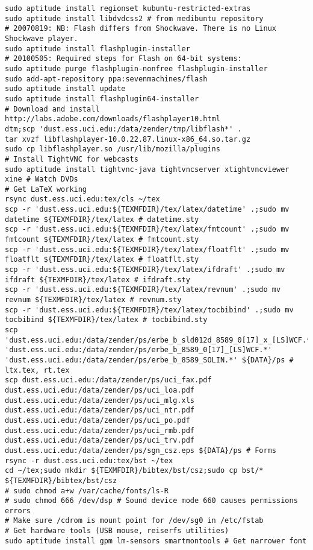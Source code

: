 \documentclass[12pt,twoside]{article}
\begin{document}
\begin{verbatim}
sudo aptitude install regionset kubuntu-restricted-extras
sudo aptitude install libdvdcss2 # from medibuntu repository
# 20070819: NB: Flash differs from Shockwave. There is no Linux Shockwave player.
sudo aptitude install flashplugin-installer
# 20100505: Required steps for Flash on 64-bit systems:
sudo aptitude purge flashplugin-nonfree flashplugin-installer
sudo add-apt-repository ppa:sevenmachines/flash
sudo aptitude install update
sudo aptitude install flashplugin64-installer
# Download and install http://labs.adobe.com/downloads/flashplayer10.html
dtm;scp 'dust.ess.uci.edu:/data/zender/tmp/libflash*' .
tar xvzf libflashplayer-10.0.22.87.linux-x86_64.so.tar.gz
sudo cp libflashplayer.so /usr/lib/mozilla/plugins
# Install TightVNC for webcasts
sudo aptitude install tightvnc-java tightvncserver xtightvncviewer
xine # Watch DVDs
# Get LaTeX working
rsync dust.ess.uci.edu:tex/cls ~/tex
scp -r 'dust.ess.uci.edu:${TEXMFDIR}/tex/latex/datetime' .;sudo mv datetime ${TEXMFDIR}/tex/latex # datetime.sty
scp -r 'dust.ess.uci.edu:${TEXMFDIR}/tex/latex/fmtcount' .;sudo mv fmtcount ${TEXMFDIR}/tex/latex # fmtcount.sty
scp -r 'dust.ess.uci.edu:${TEXMFDIR}/tex/latex/floatflt' .;sudo mv floatflt ${TEXMFDIR}/tex/latex # floatflt.sty
scp -r 'dust.ess.uci.edu:${TEXMFDIR}/tex/latex/ifdraft' .;sudo mv ifdraft ${TEXMFDIR}/tex/latex # ifdraft.sty
scp -r 'dust.ess.uci.edu:${TEXMFDIR}/tex/latex/revnum' .;sudo mv revnum ${TEXMFDIR}/tex/latex # revnum.sty
scp -r 'dust.ess.uci.edu:${TEXMFDIR}/tex/latex/tocbibind' .;sudo mv tocbibind ${TEXMFDIR}/tex/latex # tocbibind.sty
scp 'dust.ess.uci.edu:/data/zender/ps/erbe_b_sld012d_8589_0[17]_x_[LS]WCF.*' 'dust.ess.uci.edu:/data/zender/ps/erbe_b_8589_0[17]_[LS]WCF.*' 'dust.ess.uci.edu:/data/zender/ps/erbe_b_8589_SOLIN.*' ${DATA}/ps # ltx.tex, rt.tex
scp dust.ess.uci.edu:/data/zender/ps/uci_fax.pdf dust.ess.uci.edu:/data/zender/ps/uci_loa.pdf dust.ess.uci.edu:/data/zender/ps/uci_mlg.xls dust.ess.uci.edu:/data/zender/ps/uci_ntr.pdf dust.ess.uci.edu:/data/zender/ps/uci_po.pdf dust.ess.uci.edu:/data/zender/ps/uci_rmb.pdf dust.ess.uci.edu:/data/zender/ps/uci_trv.pdf dust.ess.uci.edu:/data/zender/ps/sgn_csz.eps ${DATA}/ps # Forms
rsync -r dust.ess.uci.edu:tex/bst ~/tex
cd ~/tex;sudo mkdir ${TEXMFDIR}/bibtex/bst/csz;sudo cp bst/* ${TEXMFDIR}/bibtex/bst/csz
# sudo chmod a+w /var/cache/fonts/ls-R
# sudo chmod 666 /dev/dsp # Sound device mode 660 causes permissions errors
# Make sure /cdrom is mount point for /dev/sg0 in /etc/fstab
# Get hardware tools (USB mouse, reiserfs utilities)
sudo aptitude install gpm lm-sensors smartmontools # Get narrower font

\end{verbatim}
\end{document}
